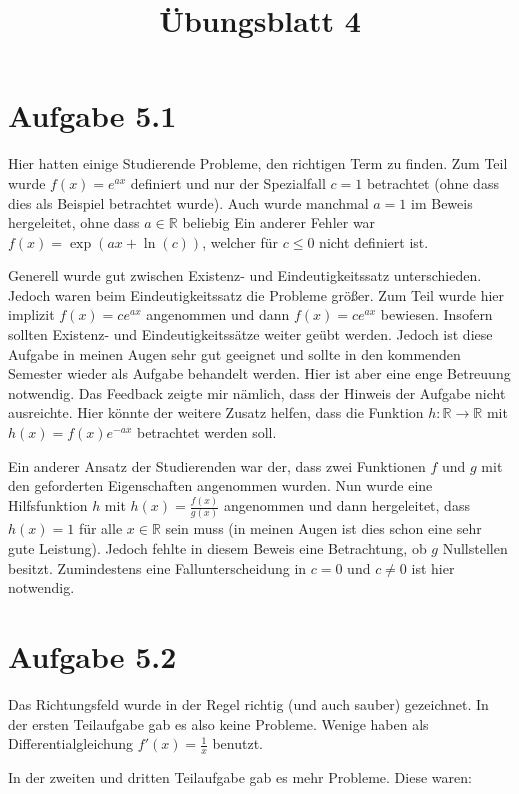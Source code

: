 \documentclass[a4paper]{article}
\title{Übungsblatt 4}
\date{}
\newcommand*{\R}{\mathbb R}
\begin{document}
\maketitle

\section{Aufgabe 5.1}

Hier hatten einige Studierende Probleme, den richtigen Term zu finden. Zum Teil wurde $f(x)=e^{ax}$ definiert und nur der Spezialfall $c=1$ betrachtet (ohne dass dies als Beispiel betrachtet wurde). Auch wurde manchmal $a=1$ im Beweis hergeleitet, ohne dass $a\in\R$ beliebig Ein anderer Fehler war $f(x)=\exp(ax+\ln(c))$, welcher für $c \le 0$ nicht definiert ist.

Generell wurde gut zwischen Existenz- und Eindeutigkeitssatz unterschieden. Jedoch waren beim Eindeutigkeitssatz die Probleme größer. Zum Teil wurde hier implizit $f(x)=ce^{ax}$ angenommen und dann $f(x)=ce^{ax}$ bewiesen. Insofern sollten Existenz- und Eindeutigkeitssätze weiter geübt werden. Jedoch ist diese Aufgabe in meinen Augen sehr gut geeignet und sollte in den kommenden Semester wieder als Aufgabe behandelt werden. Hier ist aber eine enge Betreuung notwendig. Das Feedback zeigte mir nämlich, dass der Hinweis der Aufgabe nicht ausreichte. Hier könnte der weitere Zusatz helfen, dass die Funktion $h:\R\to\R$ mit $h(x)=f(x)e^{-ax}$ betrachtet werden soll.

Ein anderer Ansatz der Studierenden war der, dass zwei Funktionen $f$ und $g$ mit den geforderten Eigenschaften angenommen wurden. Nun wurde eine Hilfsfunktion $h$ mit $h(x)=\frac{f(x)}{g(x)}$ angenommen und dann hergeleitet, dass $h(x)=1$ für alle $x\in\R$ sein muss (in meinen Augen ist dies schon eine sehr gute Leistung). Jedoch fehlte in diesem Beweis eine Betrachtung, ob $g$ Nullstellen besitzt. Zumindestens eine Fallunterscheidung in $c=0$ und $c\neq 0$ ist hier notwendig.

\section{Aufgabe 5.2}

Das Richtungsfeld wurde in der Regel richtig (und auch sauber) gezeichnet. In der ersten Teilaufgabe gab es also keine Probleme. Wenige haben als Differentialgleichung $f'(x)=\frac{1}{x}$ benutzt.

In der zweiten und dritten Teilaufgabe gab es mehr Probleme. Diese waren:
\end{document}
